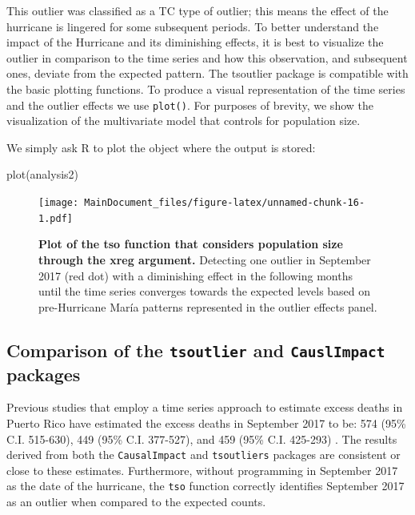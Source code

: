 \documentclass[12pt]{article}
\newenvironment{Shaded}{\begin{snugshade}}{\end{snugshade}}
\newcommand{\FunctionTok}[1]{\textcolor[rgb]{0.00,0.00,0.00}{#1}}
\newcommand{\NormalTok}[1]{#1}
\begin{document}
This outlier was classified as a TC type of outlier; this means the
effect of the hurricane is lingered for some subsequent periods. To
better understand the impact of the Hurricane and its diminishing
effects, it is best to visualize the outlier in comparison to the time
series and how this observation, and subsequent ones, deviate from the
expected pattern. The tsoutlier package is compatible with the basic
plotting functions. To produce a visual representation of the time
series and the outlier effects we use \texttt{plot()}. For purposes of
brevity, we show the visualization of the multivariate model that
controls for population size.

We simply ask R to plot the object where the output is stored:

\begin{Shaded}
\begin{Highlighting}[]
\FunctionTok{plot}\NormalTok{(analysis2)}
\end{Highlighting}
\end{Shaded}

\begin{figure}
\centering
\texttt{[image: MainDocument\_files/figure-latex/unnamed-chunk-16-1.pdf]}
\caption{\textbf{Plot of the tso function that considers population size through the xreg argument.}
Detecting one outlier in September 2017 (red dot) with a diminishing
effect in the following months until the time series converges towards
the expected levels based on pre-Hurricane María patterns represented in
the outlier effects panel. \label{tso-plot}}
\end{figure}

\hypertarget{comparison-of-the-tsoutlier-and-causlimpact-packages}{%
\subsection{\texorpdfstring{Comparison of the \texttt{tsoutlier} and
\texttt{CauslImpact}
packages}{Comparison of the tsoutlier and CauslImpact packages}}\label{comparison-of-the-tsoutlier-and-causlimpact-packages}}

Previous studies that employ a time series approach to estimate excess
deaths in Puerto Rico have estimated the excess deaths in September 2017
to be: 574 (95\% C.I. 515-630), 449 (95\% C.I. 377-527), and 459 (95\%
C.I. 425-293)
\citep{rivera_estimating_2018, santos2018differential, santos2018use}.
The results derived from both the \texttt{CausalImpact} and
\texttt{tsoutliers} packages are consistent or close to these estimates.
Furthermore, without programming in September 2017 as the date of the
hurricane, the \texttt{tso} function correctly identifies September 2017
as an outlier when compared to the expected counts.
\end{document}
